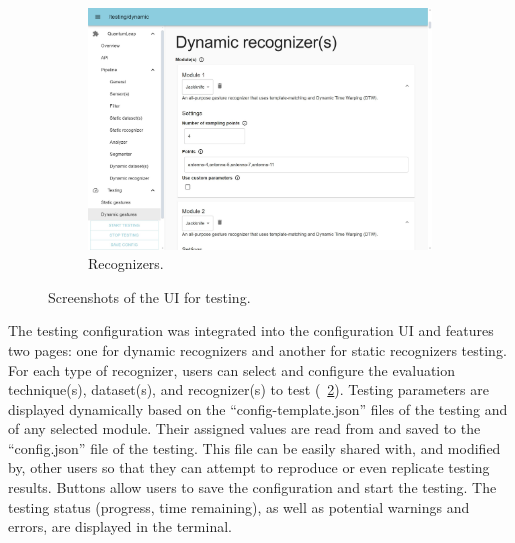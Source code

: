 \begin{figure}[bt]
  \begin{subfigure}{.49\textwidth}
      \centering
      \includegraphics[width=\linewidth]{Figures/QuantumLeapTesting/QL-Testing-Recognizers.pdf}  
      \vspace{-15pt}
      \captionsetup{width=.9\linewidth}
      \caption{Recognizers.}
      \label{fig:quantumleap-testing:ui:3}
  \end{subfigure}

  \caption{Screenshots of the \ql UI for testing.}
  \label{fig:quantumleap-testing:ui}
\end{figure}

The testing configuration was integrated into the \ql configuration UI and features two pages: one for dynamic recognizers and another for static recognizers testing. For each type of recognizer, users can select and configure the evaluation technique(s), dataset(s), and recognizer(s) to test (\fig~\ref{fig:quantumleap-testing:ui}).
%
Testing parameters are displayed dynamically based on the ``config-template.json'' files of the testing and of any selected module. Their assigned values are read from and saved to the ``config.json'' file of the testing. This file can be easily shared with, and modified by, other users so that they can attempt to reproduce or even replicate testing results. 
%
Buttons allow users to save the configuration and start the testing. The testing status (progress, time remaining), as well as potential warnings and errors, are displayed in the terminal. 

